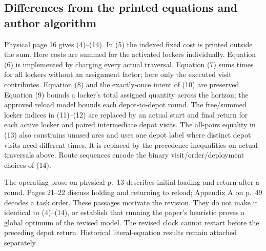 \documentclass[11pt]{article}
\begin{document}
\subsection*{Differences from the printed equations and author algorithm}
Physical page 16 gives (4)--(14). In (5) the indexed fixed cost is printed
outside the sum. Here costs are summed for the activated lockers individually.
Equation (6) is implemented by charging every actual traversal. Equation (7)
sums times for all lockers without an assignment factor; here only the
executed visit contributes. Equation (8) and the exactly-once intent of (10)
are preserved. Equation (9) bounds a locker's total assigned quantity across
the horizon; the approved reload model bounds each depot-to-depot round.
The free/summed locker indices in (11)--(12) are replaced by an actual
start and final return for each active locker and paired intermediate depot
visits. The all-pairs equality in (13) also constrains unused arcs and
uses one depot label where distinct depot visits need different times.
It is replaced by the precedence inequalities on actual traversals above.
Route sequences encode the binary visit/order/deployment choices of (14).

The operating prose on physical p.~13 describes initial loading and return
after a round. Pages 21--22 discuss holding and returning to reload;
Appendix A on p.~49 decodes a task order. These passages motivate the
revision. They do not make it identical to (4)--(14), or establish that
running the paper's heuristic proves a global optimum of the revised model.
The revised clock cannot restart before the preceding depot return.
Historical literal-equation results remain attached separately.
\end{document}

